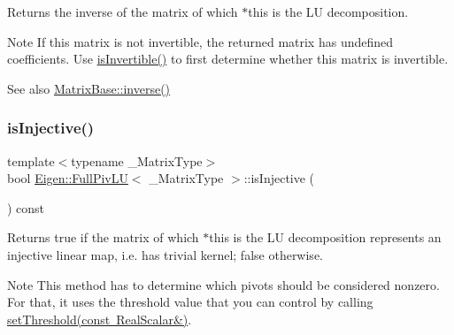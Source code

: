 \begin{DoxyReturn}{Returns}
the inverse of the matrix of which $\ast$this is the LU decomposition.
\end{DoxyReturn}
\begin{DoxyNote}{Note}
If this matrix is not invertible, the returned matrix has undefined coefficients. Use \mbox{\hyperlink{class_eigen_1_1_full_piv_l_u_afdf2579c93473650f2ef2a47a376c4a0}{is\+Invertible()}} to first determine whether this matrix is invertible.
\end{DoxyNote}
\begin{DoxySeeAlso}{See also}
\mbox{\hyperlink{class_eigen_1_1_matrix_base_a7712eb69e8ea3c8f7b8da1c44dbdeebf}{Matrix\+Base\+::inverse()}} 
\end{DoxySeeAlso}
\mbox{\label{class_eigen_1_1_full_piv_l_u_ab13992c852aa593461d9b81790b56667}} 
\subsubsection{\texorpdfstring{isInjective()}{isInjective()}}
{\footnotesize\ttfamily template$<$typename \+\_\+\+Matrix\+Type$>$ \\
bool \mbox{\hyperlink{class_eigen_1_1_full_piv_l_u}{Eigen\+::\+Full\+Piv\+LU}}$<$ \+\_\+\+Matrix\+Type $>$\+::is\+Injective (\begin{DoxyParamCaption}{ }\end{DoxyParamCaption}) const\hspace{0.3cm}{\ttfamily [inline]}}

\begin{DoxyReturn}{Returns}
true if the matrix of which $\ast$this is the LU decomposition represents an injective linear map, i.\+e. has trivial kernel; false otherwise.
\end{DoxyReturn}
\begin{DoxyNote}{Note}
This method has to determine which pivots should be considered nonzero. For that, it uses the threshold value that you can control by calling \mbox{\hyperlink{class_eigen_1_1_full_piv_l_u_a414592d82de98f5bd075965caf56d681}{set\+Threshold(const Real\+Scalar\&)}}. 
\end{DoxyNote}
\mbox{\label{class_eigen_1_1_full_piv_l_u_afdf2579c93473650f2ef2a47a376c4a0}} 
